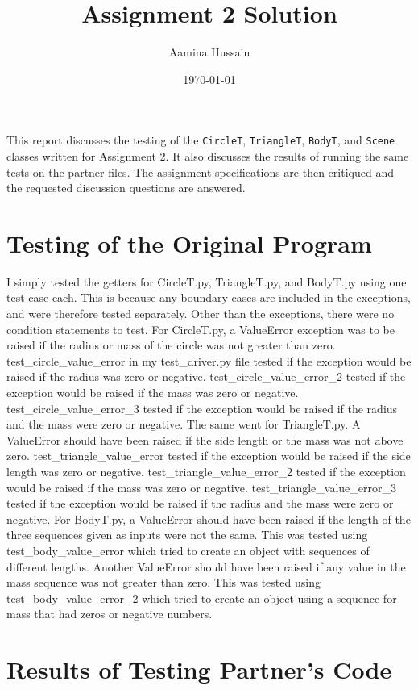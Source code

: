 \documentclass[12pt]{article}
\title{Assignment 2 Solution}
\author{Aamina Hussain}
\date{\today}
\begin{document}
\maketitle

This report discusses the testing of the \verb|CircleT|, \verb|TriangleT|, \verb|BodyT|, and \verb|Scene| classes written for Assignment 2. It also discusses the results
of running the same tests on the partner files. The assignment specifications
are then critiqued and the requested discussion questions are answered.

\section{Testing of the Original Program}

I simply tested the getters for CircleT.py, TriangleT.py, and BodyT.py using one test case each. This is because any boundary cases are included in the exceptions, and were therefore tested separately. Other than the exceptions, there were no condition statements to test. For CircleT.py, a ValueError exception was to be raised if the radius or mass of the circle was not greater than zero. test\_circle\_value\_error in my test\_driver.py file tested if the exception would be raised if the radius was zero or negative. test\_circle\_value\_error\_2 tested if the exception would be raised if the mass was zero or negative. test\_circle\_value\_error\_3 tested if the exception would be raised if the radius and the mass were zero or negative. The same went for TriangleT.py. A ValueError should have been raised if the side length or the mass was not above zero. test\_triangle\_value\_error tested if the exception would be raised if the side length was zero or negative. test\_triangle\_value\_error\_2 tested if the exception would be raised if the mass was zero or negative. test\_triangle\_value\_error\_3 tested if the exception would be raised if the radius and the mass were zero or negative. For BodyT.py, a ValueError should have been raised if the length of the three sequences given as inputs were not the same. This was tested using test\_body\_value\_error which tried to create an object with sequences of different lengths. Another ValueError should have been raised if any value in the mass sequence was not greater than zero. This was tested using test\_body\_value\_error\_2 which tried to create an object using a sequence for mass that had zeros or negative numbers. 

\section{Results of Testing Partner's Code}
\end{document}
